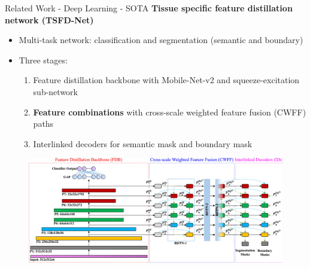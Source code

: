\documentclass[xcolor=dvipsnames]{beamer}
\begin{document}
    \begin{frame}{Related Work - Deep Learning - SOTA}
        \textbf{Tissue specific feature distillation network (TSFD-Net)~\cite{Ilyas2022}}
        \begin{itemize}
            \item Multi-task network: classification and segmentation (semantic and boundary)
            \item Three stages:
            \begin{enumerate}
                \item Feature distillation backbone with Mobile-Net-v2 and squeeze-excitation sub-network
                \item \textbf{Feature combinations} with cross-scale weighted feature fusion (CWFF) paths
                \item Interlinked decoders for semantic mask and boundary mask
            \end{enumerate}
        \end{itemize}
        
        \begin{figure}
           \centering
           \includegraphics[width=0.7\paperwidth]{img/1-s2.0-S0893608022000612-gr3_lrg-crop.jpg}
       \end{figure}
    \end{frame}
\end{document}
